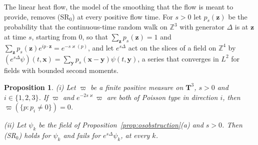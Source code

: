 \documentclass[aps,prd,twocolumn,superscriptaddress,nofootinbib,longbibliography,floatfix,amsmath,amssymb,10pt]{revtex4-2}
\newtheorem{proposition}[theorem]{Proposition}
\theoremstyle{definition}
\theoremstyle{remark}
\newcommand{\Z}{\mathbb{Z}}
\begin{document}
The linear heat flow, the model of the smoothing that the flow is meant to
provide, removes (SR$_0$) at every positive flow time. For $s>0$ let
$p_s(\mathbf z)$ be the probability that the continuous-time random walk on
$\Z^3$ with generator $\Delta$ is at $\mathbf z$ at time $s$, starting from
$0$, so that $\sum_{\mathbf z}p_s(\mathbf z)=1$ and $\sum_{\mathbf z}p_s(\mathbf z)e^{ip\cdot\mathbf z}=
e^{-s\varkappa(p)}$, and let $e^{s\Delta}$ act on the slices of a field on
$\Z^4$ by $(e^{s\Delta}\psi)(t,\mathbf x)=\sum_{\mathbf y}p_s(\mathbf x-
\mathbf y)\psi(t,\mathbf y)$, a series that converges in $L^2$ for fields
with bounded second moments.

\begin{proposition}\label{prop:heatrp}
\textup{(i)} Let $\varpi$ be a finite positive measure on $\mathbf T^3$, $s>0$
and $i\in\{1,2,3\}$. If $\varpi$ and $e^{-2s\varkappa}\varpi$ are both of
Poisson type in direction $i$, then $\varpi(\{p:p_i\ne0\})=0$.

\textup{(ii)} Let $\psi_k$ be the field of
Proposition~\textup{\ref{prop:osobstruction}(a)} and $s>0$. Then
\textup{(SR$_0$)} holds for $\psi_k$ and fails for $e^{s\Delta}\psi_k$, at
every $k$.
\end{proposition}
\end{document}
